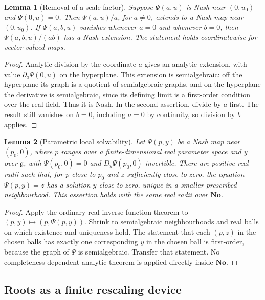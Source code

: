 \documentclass[11pt,letterpaper]{article}
\numberwithin{equation}{section}
\newtheorem{lemma}[lemma]{Lemma}
\theoremstyle{definition}
\theoremstyle{remark}
\newcommand{\No}{\mathbf{No}}
\begin{document}
\begin{lemma}[Removal of a scale factor]\label{e3:cpt:lem:division}
Suppose $\Psi(a,u)$ is Nash near $(0,u_0)$ and $\Psi(0,u)=0$. Then
$\Psi(a,u)/a$, for $a\ne0$, extends to a Nash map near $(0,u_0)$. If
$\Psi(a,b,u)$ vanishes whenever $a=0$ and whenever $b=0$, then
$\Psi(a,b,u)/(ab)$ has a Nash extension. The statement holds coordinatewise for
vector-valued maps.
\end{lemma}
\begin{proof}
Analytic division by the coordinate $a$ gives an analytic extension, with value
$\partial_a\Psi(0,u)$ on the hyperplane. This extension is semialgebraic: off
the hyperplane its graph is a quotient of semialgebraic graphs, and on the
hyperplane the derivative is semialgebraic, since its defining limit is a
first-order condition over the real field. Thus it is Nash. In the second
assertion, divide by $a$ first. The result still vanishes on $b=0$, including
$a=0$ by continuity, so division by $b$ applies.
\end{proof}

\begin{lemma}[Parametric local solvability]\label{e3:cpt:lem:ift}
Let $\Psi(p,y)$ be a Nash map near $(p_0,0)$, where $p$ ranges over a
finite-dimensional real parameter space and $y$ over $\mathfrak g$, with
$\Psi(p_0,0)=0$ and $D_y\Psi(p_0,0)$ invertible. There are positive real radii
such that, for $p$ close to $p_0$ and $z$ sufficiently close to zero, the
equation $\Psi(p,y)=z$ has a solution $y$ close to zero, unique in a smaller
prescribed neighbourhood. This assertion holds with the same real radii over
$\No$.
\end{lemma}
\begin{proof}
Apply the ordinary real inverse function theorem to $(p,y)\mapsto(p,\Psi(p,y))$.
Shrink to semialgebraic neighbourhoods and real balls on which existence and
uniqueness hold. The statement that each $(p,z)$ in the chosen balls has exactly
one corresponding $y$ in the chosen ball is first-order, because the graph of
$\Psi$ is semialgebraic. Transfer that statement. No completeness-dependent
analytic theorem is applied directly inside $\No$.
\end{proof}

\subsection{Roots as a finite rescaling device}
\end{document}
